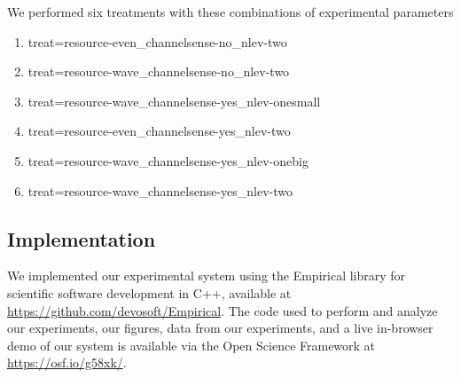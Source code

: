 We performed six treatments with these combinations of experimental parameters
\begin{enumerate}
\item treat=resource-even\_channelsense-no\_nlev-two
\item treat=resource-wave\_channelsense-no\_nlev-two
\item treat=resource-wave\_channelsense-yes\_nlev-onesmall
\item treat=resource-even\_channelsense-yes\_nlev-two
\item treat=resource-wave\_channelsense-yes\_nlev-onebig
\item treat=resource-wave\_channelsense-yes\_nlev-two
\end{enumerate}

\subsection{Implementation}

We implemented our experimental system using the Empirical library for scientific software development in C++, available at \url{https://github.com/devosoft/Empirical}.
The code used to perform and analyze our experiments, our figures, data from our experiments, and a live in-browser demo of our system is available via the Open Science Framework at \url{https://osf.io/g58xk/}.
